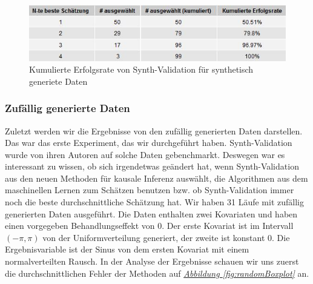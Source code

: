 \documentclass[12pt,a4paper,twoside]{scrartcl}
\numberwithin{equation}{section}
\newcommand{\reffig}[1]{\emph{\hyperref[#1]{Abbildung \ref*{#1}}}}
\begin{document}
\begin{center}
\begin{figure}[h]
    \centering
    \includegraphics[height=0.2\textwidth, width=1\textwidth]{figures/plots/generatedDataGrid.jpeg}
    \vspace{1mm}
    \caption[Kumulierte Erfolgsrate von Synth-Validation für synthetisch generiete Daten]{Kumulierte Erfolgsrate von Synth-Validation für synthetisch generiete Daten}\label{fig:generatedDataGrid}
  \end{figure}
\end{center}

\subsubsection{Zufällig generierte Daten}\label{subsubsec:ergebnisseZufälligGeneriertenDaten}
Zuletzt werden wir die Ergebnisse von den zufällig generierten Daten darstellen. Das war das erste Experiment, das wir durchgeführt haben. Synth-Validation wurde von ihren Autoren auf solche Daten gebenchmarkt. Deswegen war es interessant zu wissen, ob sich irgendetwas geändert hat, wenn Synth-Validation aus den neuen Methoden für kausale Inferenz auswählt, die Algorithmen aus dem maschinellen Lernen zum Schätzen benutzen bzw. ob Synth-Validation immer noch die beste durchschnittliche Schätzung hat. Wir haben 31 Läufe mit zufällig generierten Daten ausgeführt. Die Daten enthalten zwei Kovariaten und haben einen vorgegeben Behandlungseffekt von 0. Der erste Kovariat ist im Intervall $(- \pi,\pi )$ von der Uniformverteilung generiert, der zweite ist konstant 0. Die Ergebnisvariable ist der Sinus von dem ersten Kovariat mit einem normalverteilten Rausch. In der Analyse der Ergebnisse schauen wir uns zuerst die durchschnittlichen Fehler der Methoden auf \reffig{fig:randomBoxplot} an. 
\end{document}
